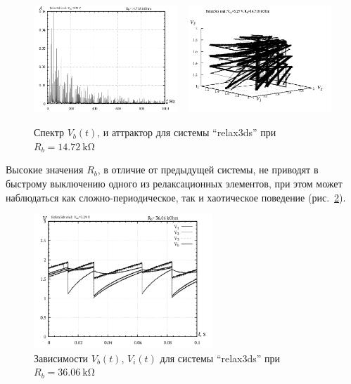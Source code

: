 \begin{figure}[htb!]
  \centerline{
    \includegraphics[width=0.48\textwidth]{p/relax3ds_f_014718.png}
    ~
    \includegraphics[width=0.48\textwidth]{p/relax3ds_v1v2v3_014718.png}
  }
  \caption{Спектр $V_b(t)$, и аттрактор для системы ``relax3ds'' при $R_b=\SI{14.72}{\kilo\ohm}$ }
  \label{atu:f:relax3ds_f_14718}
\end{figure}

Высокие значения $R_b$, в отличие от предыдущей системы,
не приводят в быстрому выключению одного из релаксационных
элементов, при этом может наблюдаться как сложно-периодическое,
так и хаотическое поведение
(рис.~\ref{atu:f:relax3ds_t_36060}).

\begin{figure}[htb!]
  \centerline{\includegraphics[width=0.6\textwidth]{p/relax3ds_t_036060.png} }
  \caption{Зависимости $V_b(t)$, $V_i(t)$ для системы ``relax3ds'' при $R_b=\SI{36.06}{\kilo\ohm}$ }
  \label{atu:f:relax3ds_t_36060}
\end{figure}


